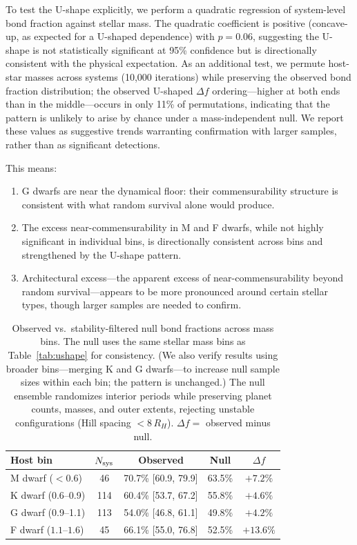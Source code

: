 \documentclass[twocolumn,usenatbib]{mnras}
\begin{document}
To test the U-shape explicitly, we perform a quadratic regression of
system-level bond fraction against stellar mass. The quadratic coefficient is
positive (concave-up, as expected for a U-shaped dependence) with $p = 0.06$,
suggesting the U-shape is not statistically significant at 95\% confidence but
is directionally consistent with the physical expectation. As an additional test, we permute host-star
masses across systems (10,000 iterations) while preserving the observed bond
fraction distribution; the observed U-shaped $\Delta f$ ordering---higher at
both ends than in the middle---occurs in only 11\% of permutations,
indicating that the pattern is unlikely to arise by chance under a
mass-independent null. We report these values as suggestive trends warranting
confirmation with larger samples, rather than as significant detections.

This means:
\begin{enumerate}
  \item G dwarfs are near the dynamical floor: their commensurability
        structure is consistent with what random survival alone would produce.
  \item The excess near-commensurability in M and F dwarfs, while not highly
        significant in individual bins, is directionally consistent across bins
        and strengthened by the U-shape pattern.
  \item Architectural excess---the apparent excess of near-commensurability
        beyond random survival---appears to be more pronounced around
        certain stellar types, though larger samples are needed to confirm.
\end{enumerate}

\begin{table}
\centering
\caption{Observed vs.\ stability-filtered null bond fractions across mass bins.
The null uses the same stellar mass bins as Table~\ref{tab:ushape} for consistency.
(We also verify results using broader bins---merging K and G dwarfs---to increase
null sample sizes within each bin; the pattern is unchanged.) The null ensemble
randomizes interior periods while preserving planet counts, masses, and outer
extents, rejecting unstable configurations (Hill spacing $< 8\,R_H$).
$\Delta f =$ observed minus null.}
\label{tab:null}
\begin{tabular}{lcccc}
\hline
Host bin & $N_{\rm sys}$ & Observed & Null & $\Delta f$\\
\hline
M dwarf ($<0.6$) & 46 & 70.7\% [60.9, 79.9] & 63.5\% & $+7.2\%$\\
K dwarf (0.6--0.9) & 114 & 60.4\% [53.7, 67.2] & 55.8\% & $+4.6\%$\\
G dwarf (0.9--1.1) & 113 & 54.0\% [46.8, 61.1] & 49.8\% & $+4.2\%$\\
F dwarf ($1.1$--$1.6$) & 45 & 66.1\% [55.0, 76.8] & 52.5\% & $+13.6\%$\\
\hline
\end{tabular}
\end{table}
\end{document}
